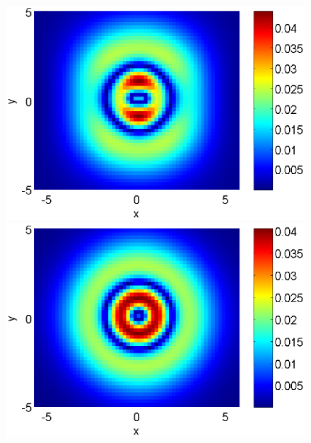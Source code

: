 \documentclass{article}
\begin{document}
\begin{figure}[htbp]
	\begin{minipage}[b]{0.48\linewidth}
		\raggedleft
		\includegraphics[width=\linewidth]{../EllipticEquationSJC/differences/difference_c=03_beta=1.eps}
	\end{minipage}
	\begin{minipage}[b]{0.48\linewidth}
		 \raggedright
		\includegraphics[width=\linewidth]{../EllipticEquationSJC/differences/difference_c=01_beta=1.eps}
	\end{minipage}
	\begin{minipage}[b]{0.48\linewidth}
		\raggedleft

\end{minipage}
\end{figure}
\end{document}
